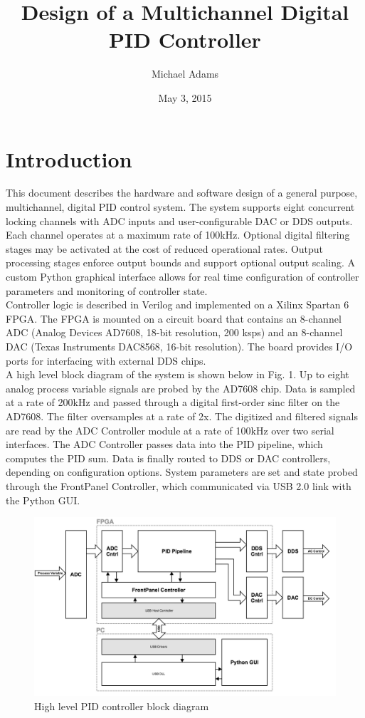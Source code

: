 \documentclass[11pt]{article}
\title{Design of a Multichannel Digital PID Controller}
\author{Michael Adams}
\date{May 3, 2015}
\begin{document}
\maketitle

\section{Introduction}

This document describes the hardware and software design of a general
purpose, multichannel, digital PID control system. The system supports
eight concurrent locking channels with ADC inputs and user-configurable
DAC or DDS outputs. Each channel operates at a maximum rate of 100kHz.
Optional digital filtering stages may be activated at the cost of
reduced operational rates. Output processing stages enforce output
bounds and support optional output scaling. A custom Python graphical
interface allows for real time configuration of controller parameters
and monitoring of controller state.\\

Controller logic is described in Verilog and implemented on a Xilinx
Spartan 6 FPGA\@. The FPGA is mounted on a circuit board that contains
an 8-channel ADC (Analog Devices AD7608, 18-bit resolution, 200 ksps)
and an 8-channel DAC (Texas Instruments DAC8568, 16-bit resolution). The
board provides I/O ports for interfacing with external DDS chips.\\

A high level block diagram of the system is shown below in Fig. 1.  Up
to eight analog process variable signals are probed by the AD7608 chip.
Data is sampled at a rate of 200kHz and passed through a digital
first-order sinc filter on the AD7608. The filter oversamples at a rate
of 2x. The digitized and filtered signals are read by the ADC Controller
module at a rate of 100kHz over two serial interfaces. The ADC
Controller passes data into the PID pipeline, which computes the PID
sum. Data is finally routed to DDS or DAC controllers, depending on
configuration options. System parameters are set and state probed
through the FrontPanel Controller, which communicated via USB 2.0 link
with the Python GUI\@.\\

\begin{figure}[h]
\includegraphics[width=\textwidth]{high_level_design}
\caption{High level PID controller block diagram}
\end{figure}
\end{document}
